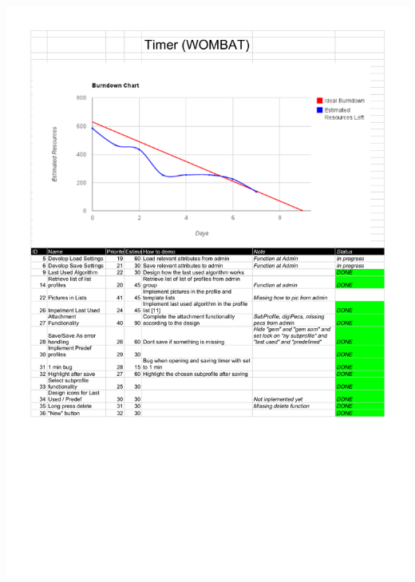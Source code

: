 \begin{center}
		\includegraphics[width=\textwidth]{Development/burndown_charts/Sprint_3.pdf}

\end{center}
